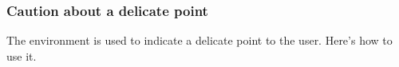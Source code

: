 \documentclass[10pt, a4paper]{article}
\begin{document}

\subsubsection{Caution about a delicate point}

The  environment is used to indicate a delicate point to the user. Here's how to use it.

\end{document}

